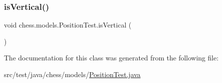 \mbox{\label{classchess_1_1models_1_1_position_test_aabe6af99895ee105f02d28f723b28df4}} 
\subsubsection{\texorpdfstring{is\+Vertical()}{isVertical()}}
{\footnotesize\ttfamily void chess.\+models.\+Position\+Test.\+is\+Vertical (\begin{DoxyParamCaption}{ }\end{DoxyParamCaption})}



The documentation for this class was generated from the following file\+:\begin{DoxyCompactItemize}
\item 
src/test/java/chess/models/\mbox{\hyperlink{_position_test_8java}{Position\+Test.\+java}}\end{DoxyCompactItemize}
